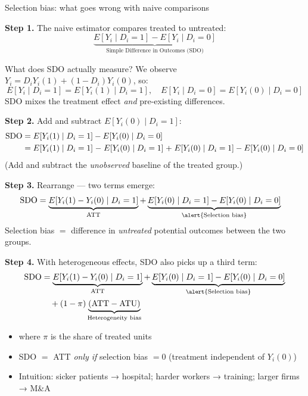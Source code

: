 \documentclass[aspectratio=169, 10pt]{beamer}
\begin{document}
\begin{frame}[shrink=10]{Selection bias: what goes wrong with naive comparisons}

  \textbf{Step 1.} The naive estimator compares treated to untreated:
  \[
    \underbrace{E[Y_i \mid D_i=1] - E[Y_i \mid D_i=0]}_{\text{Simple Difference in Outcomes (SDO)}}
  \]

  \begin{overprint}

    \medskip
    \begin{block}{What does SDO actually measure?}
      We observe $Y_i = D_i Y_i(1) + (1-D_i)Y_i(0)$, so:
      \[
        E[Y_i\mid D_i=1] = E[Y_i(1)\mid D_i=1], \quad
        E[Y_i\mid D_i=0] = E[Y_i(0)\mid D_i=0]
      \]
      SDO mixes the treatment effect \emph{and} pre-existing differences.
    \end{block}

    \medskip
    \textbf{Step 2.} Add and subtract $E[Y_i(0)\mid D_i=1]$:
    \begin{align*}
      \text{SDO}
        &= E[Y_i(1)\mid D_i=1] - E[Y_i(0)\mid D_i=0] \\
        &= E[Y_i(1)\mid D_i=1] \;{\color{ecblue}-\; E[Y_i(0)\mid D_i=1]}
           \;{\color{ecblue}+\; E[Y_i(0)\mid D_i=1]} - E[Y_i(0)\mid D_i=0]
    \end{align*}
    \small (Add and subtract the \emph{unobserved} baseline of the treated group.)

    \medskip
    \textbf{Step 3.} Rearrange — two terms emerge:
    \begin{align*}
      \text{SDO}
        &= \underbrace{E[Y_i(1) - Y_i(0)\mid D_i=1]}_{\text{ATT}}
           + \underbrace{E[Y_i(0)\mid D_i=1] - E[Y_i(0)\mid D_i=0]}_{\alert{\text{Selection bias}}}
    \end{align*}
    \small Selection bias $=$ difference in \emph{untreated} potential outcomes between the two groups.

    \medskip
    \textbf{Step 4.} With heterogeneous effects, SDO also picks up a third term:
    \begin{align*}
      \text{SDO}
        &= \underbrace{E[Y_i(1) - Y_i(0)\mid D_i=1]}_{\text{ATT}}
           + \underbrace{E[Y_i(0)\mid D_i=1] - E[Y_i(0)\mid D_i=0]}_{\alert{\text{Selection bias}}} \\
        &\quad + (1-\pi)\underbrace{(\text{ATT} - \text{ATU})}_{\text{Heterogeneity bias}}
    \end{align*}
    \smallskip
    \begin{itemize}
      \item where $\pi$ is the share of treated units
      \item SDO $=$ ATT \emph{only if} selection bias $= 0$ (treatment independent of $Y_i(0)$)
      \item Intuition: sicker patients → hospital; harder workers → training; larger firms → M\&A
    \end{itemize}

  \end{overprint}
\end{frame}
\end{document}
